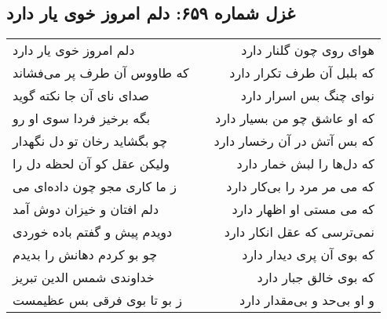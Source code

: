\begin{center}
\section*{غزل شماره ۶۵۹: دلم امروز خوی یار دارد}
\label{sec:0659}
\begin{longtable}{l p{0.5cm} r}
دلم امروز خوی یار دارد
&&
هوای روی چون گلنار دارد
\\
که طاووس آن طرف پر می‌فشاند
&&
که بلبل آن طرف تکرار دارد
\\
صدای نای آن جا نکته گوید
&&
نوای چنگ بس اسرار دارد
\\
بگه برخیز فردا سوی او رو
&&
که او عاشق چو من بسیار دارد
\\
چو بگشاید رخان تو دل نگهدار
&&
که بس آتش در آن رخسار دارد
\\
ولیکن عقل کو آن لحظه دل را
&&
که دل‌ها را لبش خمار دارد
\\
ز ما کاری مجو چون داده‌ای می
&&
که می مر مرد را بی‌کار دارد
\\
دلم افتان و خیزان دوش آمد
&&
که می مستی او اظهار دارد
\\
دویدم پیش و گفتم باده خوردی
&&
نمی‌ترسی که عقل انکار دارد
\\
چو بو کردم دهانش را بدیدم
&&
که بوی آن پری دیدار دارد
\\
خداوندی شمس الدین تبریز
&&
که بوی خالق جبار دارد
\\
ز بو تا بوی فرقی بس عظیمست
&&
و او بی‌حد و بی‌مقدار دارد
\\
\end{longtable}
\end{center}
